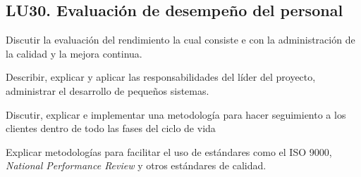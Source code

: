 \subsection{LU30. Evaluación de desempeño del personal}\label{sec:BOK-LU30}\label{sec:LU30}
\begin{LearningUnit}
\begin{LUGoal}
\item Discutir la evaluación del rendimiento  la cual consiste e con la administración de la calidad  y la mejora continua.
\end{LUGoal}

\begin{LUObjective}
\item Describir, explicar y aplicar las responsabilidades del líder del proyecto, administrar el desarrollo de pequeños sistemas.
\item Discutir, explicar e implementar una metodología para hacer seguimiento a los clientes dentro de todo las fases del ciclo de vida
\item Explicar metodologías para facilitar el uso de estándares como el ISO 9000, \textit{National Performance Review} y otros estándares de calidad.
\end{LUObjective}
\end{LearningUnit}

